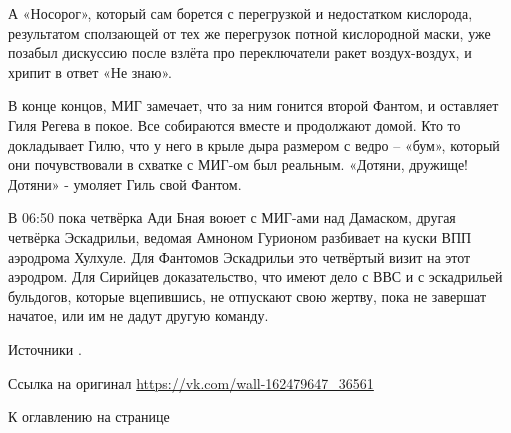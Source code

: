 \begin{textcitation}
	А «Носорог», который сам борется с перегрузкой и недостатком кислорода, результатом сползающей от тех же перегрузок потной кислородной маски, уже позабыл дискуссию после взлёта про переключатели ракет воздух-воздух, и хрипит в ответ «Не знаю». 
	
	В конце концов, МИГ замечает, что за ним гонится второй Фантом, и оставляет Гиля Регева в покое. Все собираются вместе и продолжают домой. Кто то докладывает Гилю, что у него в крыле дыра размером с ведро – «бум», который они почувствовали в схватке с МИГ-ом был реальным.
	«Дотяни, дружище! Дотяни» - умоляет Гиль свой Фантом. 
	
	В 06:50 пока четвёрка Ади Бная воюет с МИГ-ами над Дамаском, другая четвёрка Эскадрильи, ведомая Амноном Гурионом разбивает на куски ВПП аэродрома Хулхуле. Для Фантомов Эскадрильи это четвёртый визит на этот аэродром. Для Сирийцев доказательство, что имеют дело с ВВС и с эскадрильей бульдогов, которые вцепившись, не отпускают свою жертву, пока не завершат начатое, или им не дадут другую команду. 
\end{textcitation}

Источники \cite{tabet_article,barkai,segev,misnikov,kuper_nikole}.

Ссылка на оригинал \url{https://vk.com/wall-162479647_36561}

К оглавлению на странице \pageref{tablecont}